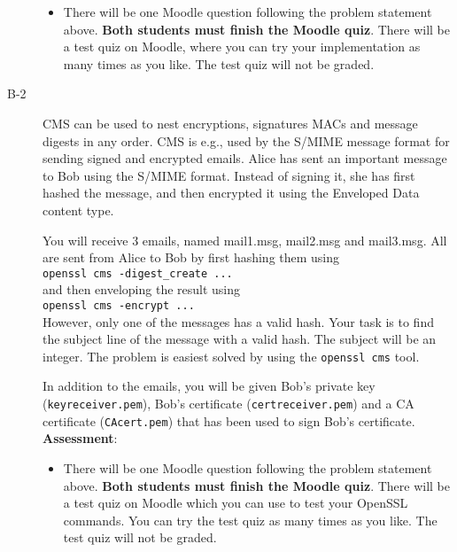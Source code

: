 \documentclass{article}
\begin{document}
\begin{description}
{\begin{itemize}
		\item There will be one Moodle question following the problem statement above. 
        \textbf{Both students must finish the Moodle quiz}.
        There will be a test quiz on Moodle, where you can try your implementation as many times as you like. 
        The test quiz will not be graded.
	\end{itemize}
    }

	\item[B-2]{CMS can be used to nest encryptions, signatures MACs and message digests in any order. CMS is e.g., used by the S/MIME message format for sending signed and encrypted emails. Alice has sent an important message to Bob using the S/MIME format. Instead of signing it, she has first hashed the message, and then encrypted it using the Enveloped Data content type.
    
You will receive 3 emails, named mail1.msg, mail2.msg and mail3.msg. All are sent from Alice to Bob by first hashing them using \\ \texttt{openssl cms -digest\_create ...}\\ and then enveloping the result using \\\texttt{openssl cms -encrypt ...}\\However, only one of the messages has a valid hash. Your task is to find the subject line of the message with a valid hash. The subject will be an integer. The problem is easiest solved by using the \texttt{openssl cms} tool.

In addition to the emails, you will be given Bob's private key (\texttt{keyreceiver.pem}), Bob's certificate (\texttt{certreceiver.pem}) and a CA certificate (\texttt{CAcert.pem}) that has been used to sign Bob's certificate.\\
    \textbf{Assessment}:
	\begin{itemize}
		\item There will be one Moodle question following the problem statement above. \textbf{Both students must finish the Moodle quiz}.
        There will be a test quiz on Moodle which you can use to test your OpenSSL commands. You can try the test quiz as many times as you like. The test quiz will not be graded.
	\end{itemize}}


\end{description}
\end{document}
